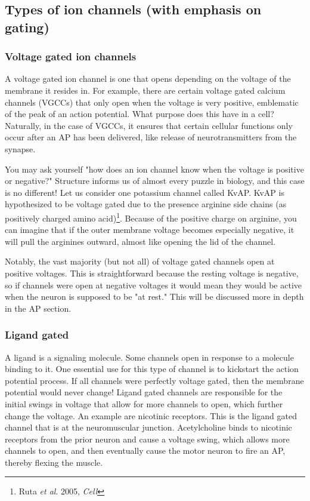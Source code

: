 \documentclass[12pt]{amsart}
\begin{document}
\subsection{Types of ion channels (with emphasis on gating)}
\subsubsection{Voltage gated ion channels} A voltage gated ion channel is one that opens depending on the voltage of the membrane it resides in. For example, there are certain voltage gated calcium channels (VGCCs) that only open when the voltage is very positive, emblematic of the peak of an action potential. What purpose does this have in a cell? Naturally, in the case of VGCCs, it ensures that certain cellular functions only occur after an AP has been delivered, like release of neurotransmitters from the synapse. \newline

You may ask yourself "how does an ion channel know when the voltage is positive or negative?" Structure informs us of almost every puzzle in biology, and this case is no different! Let us consider one potassium channel called KvAP. KvAP is hypothesized to be voltage gated due to the presence arginine side chains (as positively charged amino acid)\footnote{Ruta \textit{et al}. 2005, \textit{Cell}}. Because of the positive charge on arginine, you can imagine that if the outer membrane voltage becomes especially negative, it will pull the arginines outward, almost like opening the lid of the channel. \newline

Notably, the vast majority (but not all) of voltage gated channels open at positive voltages. This is straightforward because the resting voltage is negative, so if channels were open at negative voltages it would mean they would be active when the neuron is supposed to be "at rest." This will be discussed more in depth in the AP section. 



\subsubsection{Ligand gated} A ligand is a signaling molecule. Some channels open in response to a molecule binding to it. One essential use for this type of channel is to kickstart the action potential process. If all channels were perfectly voltage gated, then the membrane potential would never change! Ligand gated channels are responsible for the initial swings in voltage that allow for more channels to open, which further change the voltage. An example are nicotinic receptors. This is the ligand gated channel that is at the neuromuscular junction. Acetylcholine binds to nicotinic receptors from the prior neuron and cause a voltage swing, which allows more channels to open, and then eventually cause the motor neuron to fire an AP, thereby flexing the muscle. 
\end{document}
